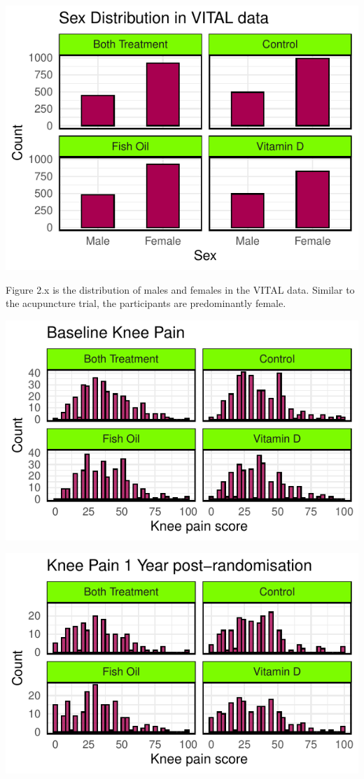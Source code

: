 \documentclass{article}
\newcommand{\pandocbounded}[1]{#1}
\begin{document}
\pandocbounded{\includegraphics[keepaspectratio]{Final_Report_files/figure-latex/unnamed-chunk-16-1.pdf}}

Figure 2.x is the distribution of males and females in the VITAL data.
Similar to the acupuncture trial, the participants are predominantly
female.

\pandocbounded{\includegraphics[keepaspectratio]{Final_Report_files/figure-latex/unnamed-chunk-17-1.pdf}}

\pandocbounded{\includegraphics[keepaspectratio]{Final_Report_files/figure-latex/unnamed-chunk-18-1.pdf}}
\end{document}
